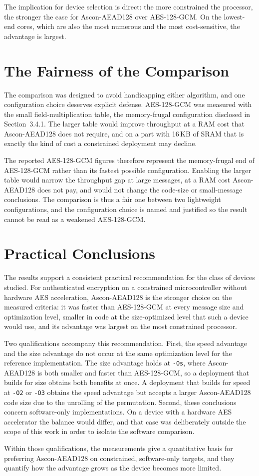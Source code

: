 The implication for device selection is direct: the more constrained the
processor, the stronger the case for Ascon-AEAD128 over AES-128-GCM.
On the lowest-end cores, which are also the most numerous and the most
cost-sensitive, the advantage is largest.

\section{The Fairness of the Comparison}

The comparison was designed to avoid handicapping either algorithm, and one
configuration choice deserves explicit defense.
AES-128-GCM was measured with the small field-multiplication table, the
memory-frugal configuration disclosed in Section~3.4.1.
The larger table would improve throughput at a RAM cost that Ascon-AEAD128 does
not require, and on a part with 16\,KB of SRAM that is exactly the kind of cost
a constrained deployment may decline.

The reported AES-128-GCM figures therefore represent the memory-frugal end of
AES-128-GCM rather than its fastest possible configuration.
Enabling the larger table would narrow the throughput gap at large messages, at
a RAM cost Ascon-AEAD128 does not pay, and would not change the code-size or
small-message conclusions.
The comparison is thus a fair one between two lightweight configurations, and
the configuration choice is named and justified so the result cannot be read as
a weakened AES-128-GCM.

\section{Practical Conclusions}

The results support a consistent practical recommendation for the class of
devices studied.
For authenticated encryption on a constrained microcontroller without hardware
AES acceleration, Ascon-AEAD128 is the stronger choice on the measured criteria:
it was faster than AES-128-GCM at every message size and optimization level,
smaller in code at the size-optimized level that such a device would use, and
its advantage was largest on the most constrained processor.

Two qualifications accompany this recommendation.
First, the speed advantage and the size advantage do not occur at the same
optimization level for the reference implementation.
The size advantage holds at \texttt{-Os}, where Ascon-AEAD128 is both smaller
and faster than AES-128-GCM, so a deployment that builds for size obtains both
benefits at once.
A deployment that builds for speed at \texttt{-O2} or \texttt{-O3} obtains the
speed advantage but accepts a larger Ascon-AEAD128 code size due to the
unrolling of the permutation.
Second, these conclusions concern software-only implementations.
On a device with a hardware AES accelerator the balance would differ, and that
case was deliberately outside the scope of this work in order to isolate the
software comparison.

Within those qualifications, the measurements give a quantitative basis for
preferring Ascon-AEAD128 on constrained, software-only targets, and they
quantify how the advantage grows as the device becomes more limited.

